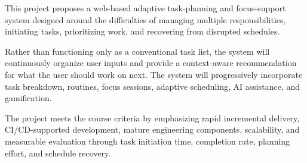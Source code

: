\documentclass[11pt,a4paper]{article}
\begin{document}
This project proposes a web-based adaptive task-planning and focus-support
system designed around the difficulties of managing multiple responsibilities,
initiating tasks, prioritizing work, and recovering from disrupted schedules.

Rather than functioning only as a conventional task list, the system will
continuously organize user inputs and provide a context-aware recommendation
for what the user should work on next. The system will progressively
incorporate task breakdown, routines, focus sessions, adaptive scheduling,
AI assistance, and gamification.

The project meets the course criteria by emphasizing rapid incremental
delivery, CI/CD-supported development, mature engineering components,
scalability, and measurable evaluation through task initiation time,
completion rate, planning effort, and schedule recovery.
\end{document}
